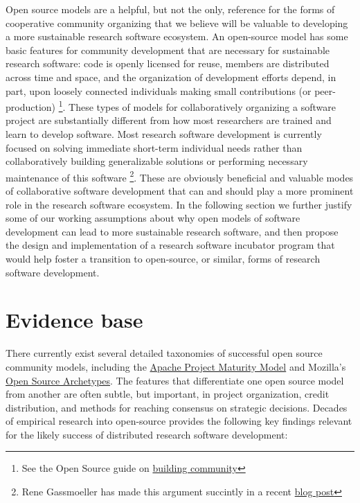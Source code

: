 \documentclass[
]{book}
\begin{document}
Open source models are a helpful, but not the only, reference for the forms of cooperative community organizing that we believe will be valuable to developing a more sustainable research software ecosystem.
An open-source model has some basic features for community development that are necessary for sustainable research software: code is openly licensed for reuse, members are distributed across time and space, and the organization of development efforts depend, in part, upon loosely connected individuals making small contributions (or peer-production) \footnote{ See the Open Source guide on \href{https://opensource.guide/building-community/}{building community}}.
These types of models for collaboratively organizing a software project are substantially different from how most researchers are trained and learn to develop software.
Most research software development is currently focused on solving immediate short-term individual needs rather than collaboratively building generalizable solutions or performing necessary maintenance of this software \footnote{Rene Gassmoeller has made this argument succintly in a recent \href{http://urssi.us/blog/2020/03/24/scientific-software-projects-and-their-communities/}{blog post}}.
These are obviously beneficial and valuable modes of collaborative software development that can and should play a more prominent role in the research software ecosystem.
In the following section we further justify some of our working assumptions about why open models of software development can lead to more sustainable research software, and then propose the design and implementation of a research software incubator program that would help foster a transition to open-source, or similar, forms of research software development.

\hypertarget{evidence-base}{%
\section{Evidence base}\label{evidence-base}}

There currently exist several detailed taxonomies of successful open source community models, including the \href{http://community.apache.org/apache-way/apache-project-maturity-model.html}{Apache Project Maturity Model} and Mozilla's \href{https://blog.mozilla.org/wp-content/uploads/2018/05/MZOTS_OS_Archetypes_report_ext_scr.pdf}{Open Source Archetypes}.
The features that differentiate one open source model from another are often subtle, but important, in project organization, credit distribution, and methods for reaching consensus on strategic decisions. Decades of empirical research into open-source provides the following key findings relevant for the likely success of distributed research software development:
\end{document}
